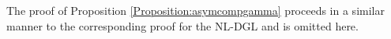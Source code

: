 \documentclass[preprintnumbers,amsmath,amssymb]{revtex4}
\begin{document}
% 
% 

The proof of 
Proposition \ref{Proposition:asymcompgamma}  proceeds in a similar manner to the corresponding proof for the NL-DGL and is omitted here.

\vspace*{0.5cm}
\end{document}
